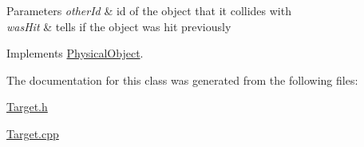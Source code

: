 \begin{DoxyParams}{Parameters}
{\em other\-Id} & id of the object that it collides with \\
\hline
{\em was\-Hit} & tells if the object was hit previously \\
\hline
\end{DoxyParams}


Implements \hyperlink{classPhysicalObject_a400ba3545479ebbf8b1b4a046906e562}{Physical\-Object}.



The documentation for this class was generated from the following files\-:\begin{DoxyCompactItemize}
\item 
\hyperlink{Target_8h}{Target.\-h}\item 
\hyperlink{Target_8cpp}{Target.\-cpp}\end{DoxyCompactItemize}
